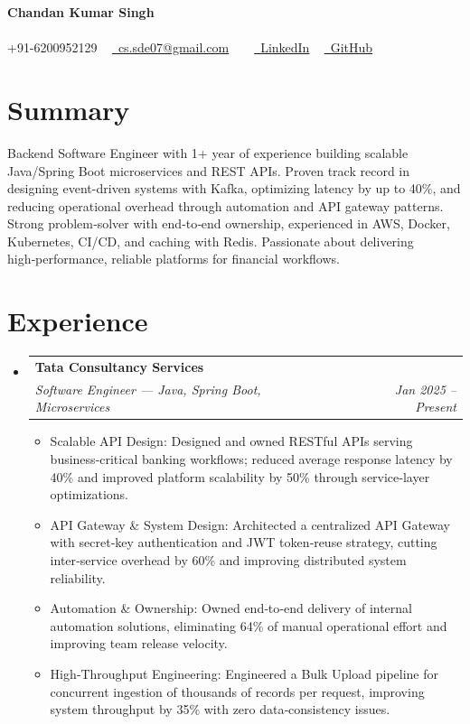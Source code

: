 \documentclass[10pt, letterpaper]{article}
\makeatletter
\newcommand{\resumeItem}[1]{
  \item\small{
    {#1 \vspace{-2pt}}
  }
}
\newcommand{\resumeSubheading}[4]{
  \vspace{-2pt}\item
    \begin{tabular*}{1.0\textwidth}[t]{l@{\extracolsep{\fill}}r}
      \textbf{#1} & \textbf{\small #2} \\
      \textit{\small#3} & \textit{\small #4} \\
    \end{tabular*}\vspace{-7pt}
}
\newcommand{\resumeSubHeadingListStart}{\begin{itemize}[leftmargin=0.0in, label={}]}
\newcommand{\resumeSubHeadingListEnd}{\end{itemize}}
\newcommand{\resumeItemListStart}{\begin{itemize}[leftmargin=0.15in]}
\newcommand{\resumeItemListEnd}{\end{itemize}\vspace{-5pt}}
\makeatother
\begin{document}
\begin{center}
    {\Huge \bfseries Chandan Kumar Singh} \\ \vspace{5pt}
    ~ \\ \vspace{5pt}
    \small \faPhone* +91-6200952129 ~ 
    \href{mailto:cs.sde07@gmail.com}{\faEnvelope~cs.sde07@gmail.com} ~ 
     ~ \href{LinkedIn}{\faLinkedin~LinkedIn}
     ~ \href{GitHub}{\faGithub~GitHub}
    
\end{center}

\section{Summary}
Backend Software Engineer with 1+ year of experience building scalable Java/Spring Boot microservices and REST APIs. Proven track record in designing event-driven systems with Kafka, optimizing latency by up to 40\%, and reducing operational overhead through automation and API gateway patterns. Strong problem‑solver with end‑to‑end ownership, experienced in AWS, Docker, Kubernetes, CI/CD, and caching with Redis. Passionate about delivering high‑performance, reliable platforms for financial workflows.


\section{Experience}
\resumeSubHeadingListStart
  \resumeSubheading{Tata Consultancy Services}{}{Software Engineer — Java, Spring Boot, Microservices}{Jan 2025 -- Present}
    \resumeItemListStart
      \resumeItem{Scalable API Design: Designed and owned RESTful APIs serving business‑critical banking workflows; reduced average response latency by 40\% and improved platform scalability by 50\% through service‑layer optimizations.}
      \resumeItem{API Gateway \& System Design: Architected a centralized API Gateway with secret‑key authentication and JWT token‑reuse strategy, cutting inter‑service overhead by 60\% and improving distributed system reliability.}
      \resumeItem{Automation \& Ownership: Owned end‑to‑end delivery of internal automation solutions, eliminating 64\% of manual operational effort and improving team release velocity.}
      \resumeItem{High‑Throughput Engineering: Engineered a Bulk Upload pipeline for concurrent ingestion of thousands of records per request, improving system throughput by 35\% with zero data‑consistency issues.}
    \resumeItemListEnd
\resumeSubHeadingListEnd
\end{document}
